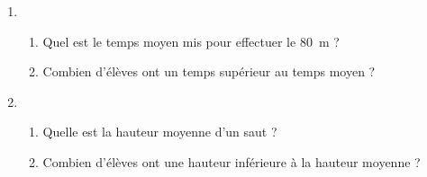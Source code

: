 \begin{enumerate}
  \item
    \begin{enumerate}
    \item Quel est le temps moyen mis pour effectuer le 80~m ?
    \item Combien d'élèves ont un temps supérieur au temps moyen ?
    \end{enumerate}
  \item
    \begin{enumerate}
    \item Quelle est la hauteur moyenne d'un saut ?
    \item Combien d'élèves ont une hauteur inférieure à la hauteur
      moyenne ?
    \end{enumerate}
\end{enumerate}

